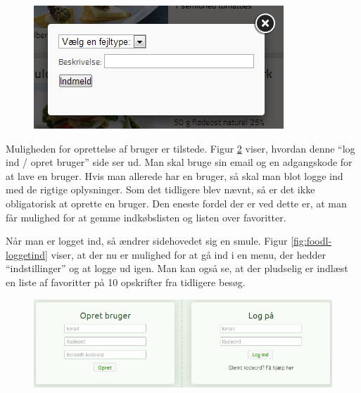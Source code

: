 \begin{figure}[H]
	\centering
	\includegraphics[scale=0.7]{billeder/foodl/fejlrapportering.jpg}
	\label{fig:foodl-fejlrapportering}
\end{figure}

Muligheden for oprettelse af bruger er tilstede. Figur \ref{fig:foodl-opret} viser, hvordan denne ``log ind / opret bruger'' side ser ud. Man skal bruge sin email og en adgangskode for at lave en bruger. Hvis man allerede har en bruger, så skal man blot logge ind med de rigtige oplysninger. Som det tidligere blev nævnt, så er det ikke obligatorisk at oprette en bruger. Den eneste fordel der er ved dette er, at man får mulighed for at gemme indkøbslisten og listen over favoritter. 

Når man er logget ind, så ændrer sidehovedet sig en smule. Figur \ref{fig:foodl-loggetind} viser, at der nu er mulighed for at gå ind i en menu, der hedder ``indstillinger'' og at logge ud igen. Man kan også se, at der pludselig er indlæst en liste af favoritter på 10 opskrifter fra tidligere besøg.

\begin{figure}[H]
	\centering
	\includegraphics[scale=0.7]{billeder/foodl/login-opret.jpg}
	\label{fig:foodl-opret}
\end{figure}


